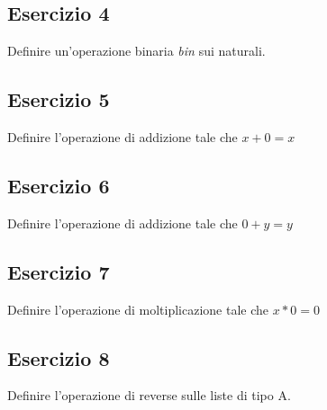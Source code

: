 \subsection{Esercizio 4}
\begin{thm}
	Definire un'operazione binaria \textit{bin} sui naturali.
\end{thm}


\subsection{Esercizio 5}
\begin{thm}
	Definire l'operazione di addizione tale che $x + 0 = x$
\end{thm}


\subsection{Esercizio 6}
\begin{thm}
	Definire l'operazione di addizione tale che $0 + y = y$
\end{thm}


\subsection{Esercizio 7}
\begin{thm}
	Definire l'operazione di moltiplicazione tale che $x * 0 = 0$
\end{thm}


\subsection{Esercizio 8}
\begin{thm}
	Definire l'operazione di reverse sulle liste di tipo A.
\end{thm}
